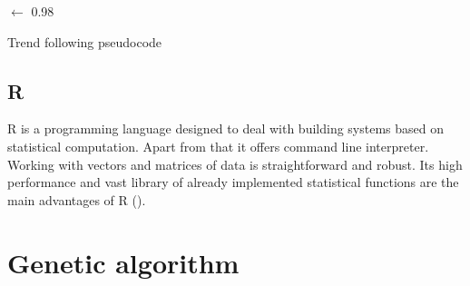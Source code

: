 \begin{algorithm}
 
 
  \BlankLine
  \maximumValueLoss $\leftarrow$ 0.98 \;
  
  \caption{Trend following pseudocode}\label{fig:tf_pseudo}
\end{algorithm}



\subsection{R}

R is a programming language designed to deal with building systems based on statistical computation.
Apart from that it offers command line interpreter.
Working with vectors and matrices of data is straightforward and robust.
Its high performance and vast library of already implemented statistical functions are the main advantages of R (\cite{R}).    

\section{Genetic algorithm}
\label{sec:genAlgoImpl}

